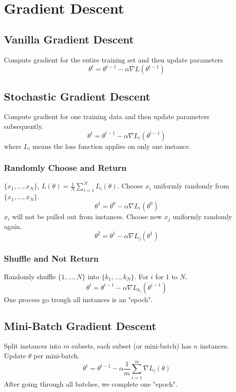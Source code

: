 \documentclass[../main.tex]{subfiles}
\begin{document}
    \section{Gradient Descent}
        \subsection{Vanilla Gradient Descent}
            Compute gradient for the entire training set and then update parameters
            \[
                \theta^t = \theta^{t-1} - \alpha \nabla L(\theta^{t-1})
            \]
        \subsection{Stochastic Gradient Descent}
            Compute gradient for one training data and then update parameters subsequently.
            \[
                \theta^t = \theta^{t-1} - \alpha\nabla L_i(\theta^{t-1})
            \]
            where $L_i$ means the loss function applies on only one instance.
            \subsubsection{Randomly Choose and Return}
                $\{x_1,\dots,x_N\}$, $L(\theta)=\frac{1}{N}\sum_{i=1}^N L_i(\theta)$. Choose $x_i$ uniformly randomly from $\{x_1,\dots,x_N\}$.
                \[
                    \theta^1 = \theta^{0}-\alpha\nabla L_i(\theta^0)
                \]
                $x_i$ will not be pulled out from instances. Choose new $x_j$ uniformly randomly again.
                \[
                    \theta^2 = \theta^1-\alpha\nabla L_j(\theta^1)
                \]
            \subsubsection{Shuffle and Not Return}
                Randomly shuffle $\{1,\dots,N\}$ into $\{k_1,\dots,k_N\}$. For $i$ for $1$ to $N$,
                \[
                    \theta^t = \theta^{t-1}-\alpha\nabla L_{k_i}(\theta^{i-1})
                \]
                One process go trough all instances is an "epoch".
        \subsection{Mini-Batch Gradient Descent}
            Split instances into $m$ subsets, each subset (or mini-batch) has $n$ instances. Update $\theta$ per mini-batch.
            \[
                \theta^t = \theta^{t-1}-\alpha \frac{1}{m}\sum_{i=1}^m\nabla L_{i}(\theta)
            \]
            After going through all batches, we complete one "epoch".
\end{document}
